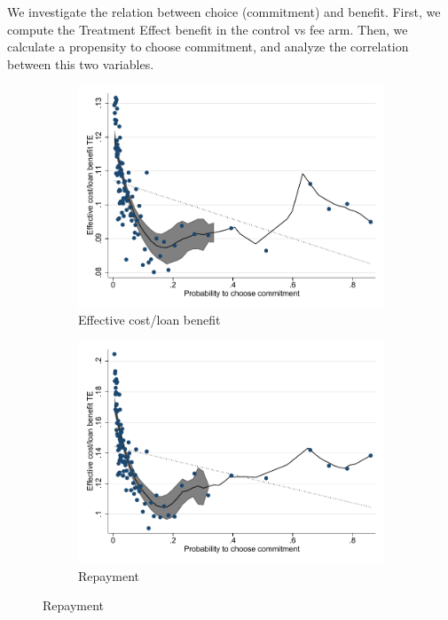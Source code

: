 \documentclass[oneside,11pt]{article}
\begin{document}
We investigate the relation between choice (commitment) and benefit. First, we compute the Treatment Effect benefit in the control vs fee arm. Then, we calculate a propensity to choose commitment, and analyze the correlation between this two variables. 




\begin{figure}[H]
    \caption{}
    \label{}
    \begin{center}
    \begin{subfigure}{0.475\textwidth}
        \caption{Effective cost/loan benefit}
        \centering
        \includegraphics[width=\textwidth]{Figuras/benefit_choice_tau_eff.pdf}
    \end{subfigure}
    \begin{subfigure}{0.475\textwidth}
        \caption{Repayment}
        \centering
        \includegraphics[width=\textwidth]{Figuras/benefit_choice_tau_des.pdf}
    \end{subfigure}
  

\end{center}
\end{figure}
\end{document}
